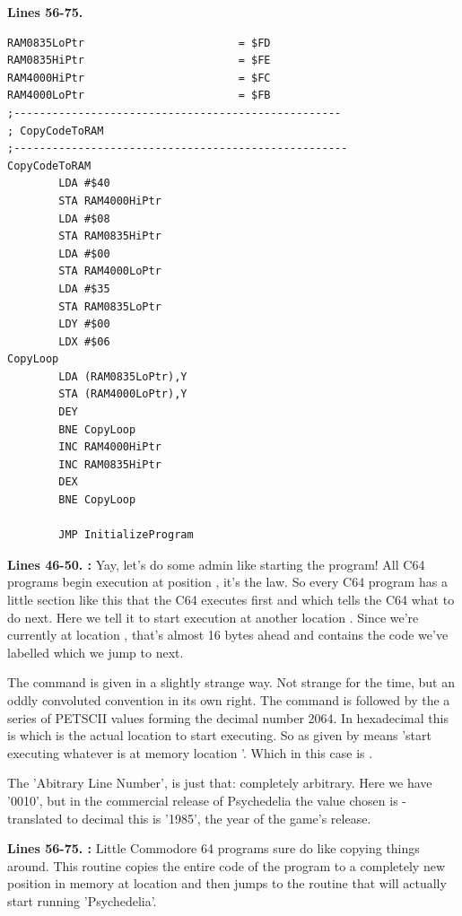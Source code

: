 \textbf{Lines 56-75. }
\begin{lstlisting}[caption=Some strictly unnecessary code copying]
RAM0835LoPtr                        = $FD
RAM0835HiPtr                        = $FE
RAM4000HiPtr                        = $FC
RAM4000LoPtr                        = $FB
;---------------------------------------------------
; CopyCodeToRAM
;----------------------------------------------------
CopyCodeToRAM
        LDA #$40
        STA RAM4000HiPtr
        LDA #$08
        STA RAM0835HiPtr
        LDA #$00
        STA RAM4000LoPtr
        LDA #$35
        STA RAM0835LoPtr
        LDY #$00                                 
        LDX #$06
CopyLoop   
        LDA (RAM0835LoPtr),Y
        STA (RAM4000LoPtr),Y
        DEY 
        BNE CopyLoop
        INC RAM4000HiPtr
        INC RAM0835HiPtr
        DEX 
        BNE CopyLoop

        JMP InitializeProgram

\end{lstlisting}
\clearpage
{}
\textbf{Lines 46-50. :} Yay, let's do some admin like starting the program! All C64 programs 
begin execution at position , it's the law.
So every C64 program has a little section like this that the C64 executes first and which tells the C64 what to do next.
Here we tell it to start execution at another location . Since we're currently at location , that's
almost 16 bytes ahead and contains the code we've labelled  which we jump to next.

The command is given in a slightly strange way. Not strange for the time, but an oddly convoluted convention in its own right.
The  command is followed by the a series of PETSCII values forming the decimal number 2064. In hexadecimal this is
 which is the actual location to start executing. So  as given by 
means 'start executing whatever is at memory location '. Which in this case is .

The 'Abitrary Line Number', is just that: completely arbitrary. Here we have '0010', but in the commercial release of Psychedelia
the value chosen is  - translated to decimal this is '1985', the year of the game's release.

\bigskip
\bigskip
\textbf{Lines 56-75. :} Little Commodore 64 programs sure do like copying things around. This routine copies the entire code of the program to a
completely new position in memory at location  and then jumps to the routine  that will actually start running
'Psychedelia'.

